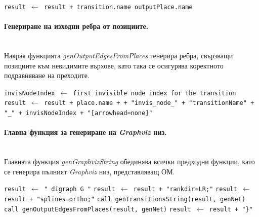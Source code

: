 \begin{algorithm}[H]
\caption{genOutgoingEdgesFromTransition(genNet, result, transition)}
\begin{algorithmic}
    \State \texttt{result $\gets$ result + transition.name  outputPlace.name  }
\EndFor
\end{algorithmic}
\end{algorithm}

\paragraph{Генериране на изходни ребра от позициите.}
\mbox{}\\
Накрая функцията \textit{genOutputEdgesFromPlaces} генерира ребра, свързващи позициите към невидимите върхове, като така се осигурява коректното подравняване на преходите.

\begin{algorithm}[H]
\caption{genOutputEdgesFromPlaces(genNet, result)}
\begin{algorithmic}
    \State \texttt{invisNodeIndex $\gets$ first invisible node index for the transition}
    \State \texttt{result $\gets$ result + place.name +  + "invis\_node\_"{} + "transitionName"{} + "\_"{} + invisNodeIndex + "[arrowhead=none]"}
\EndFor
\end{algorithmic}
\end{algorithm}

\paragraph{Главна функция за генериране на \textit{Graphviz} низ.}
\mbox{}\\
Главната функция \textit{genGraphvizString} обединява всички предходни функции, като се генерира пълният \textit{Graphviz} низ, представляващ ОМ.

\begin{algorithm}[H]
\caption{genGraphvizString(genNet)}
\begin{algorithmic}
\State \texttt{result $\gets$ "\ {digraph G} "}
\State \texttt{result $\gets$ result + "rankdir=LR;"}
\State \texttt{result $\gets$ result + "splines=ortho;"}
\State \texttt{call genTransitionsString(result, genNet)}
\State \texttt{call genOutputEdgesFromPlaces(result, genNet)}
\State \texttt{result $\gets$ result + "\}"}
\end{algorithmic}
\end{algorithm}

